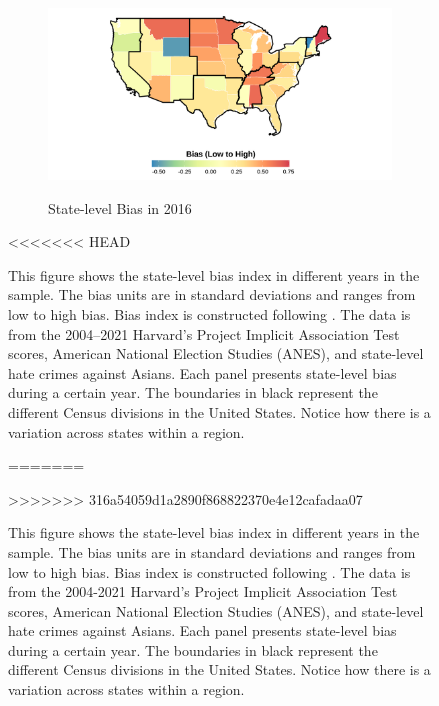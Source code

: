 \begin{center}
\begin{figure}[H]
\begin{subfigure}{.45\textwidth}
\label{fig:skiniat-map-2008}
\end{subfigure}
\hfill%
\begin{subfigure}{.45\textwidth}
\caption{State-level Bias in 2016}
\centering
\includegraphics[width=0.9\linewidth]{2016skinmap.png} 
\label{fig:skiniat-map-2010}
\end{subfigure}

<<<<<<< HEAD
\caption*{\footnotesize{This figure shows the state-level bias index in different years in the sample. The bias units are in standard deviations and ranges from low to high bias. Bias index is constructed following \textcite{lubotskyInterpretationRegressionsMultiple2006}. The data is from the 2004--2021 Harvard's Project Implicit Association Test scores, American National Election Studies (ANES), and state-level hate crimes against Asians. Each panel presents state-level bias during a certain year. The boundaries in black represent the different Census divisions in the United States. Notice how there is a variation across states within a region.}}
=======
\caption*{\footnotesize{This figure shows the state-level bias index in different years in the sample. The bias units are in standard deviations and ranges from low to high bias. Bias index is constructed following \textcite{lubotskyInterpretationRegressionsMultiple2006}. The data is from the 2004-2021 Harvard's Project Implicit Association Test scores, American National Election Studies (ANES), and state-level hate crimes against Asians. Each panel presents state-level bias during a certain year. The boundaries in black represent the different Census divisions in the United States. Notice how there is a variation across states within a region.}}
>>>>>>> 316a54059d1a2890f868822370e4e12cafadaa07
\end{figure}
\end{center}

\newpage
\pagebreak

